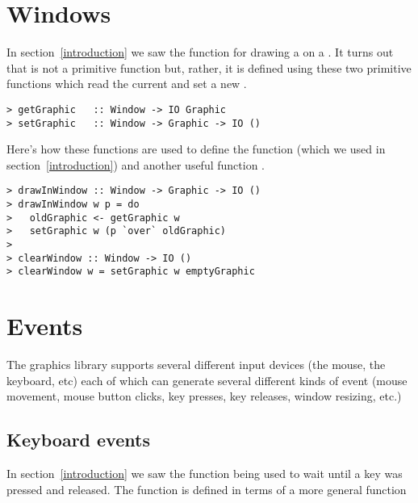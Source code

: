 
\section{Windows}\label{windows}

In section~\ref{introduction} we saw the function  for
drawing a  on a .  It turns out that
 is not a primitive function but, rather, it is defined
using these two primitive functions which read the current
 and set a new .

\begin{verbatim}
> getGraphic   :: Window -> IO Graphic
> setGraphic   :: Window -> Graphic -> IO ()
\end{verbatim}

Here's how these functions are used to define the function 
(which we used in section~\ref{introduction}) and another useful
function .

\begin{verbatim}
> drawInWindow :: Window -> Graphic -> IO ()
> drawInWindow w p = do
>   oldGraphic <- getGraphic w
>   setGraphic w (p `over` oldGraphic)
>
> clearWindow :: Window -> IO ()
> clearWindow w = setGraphic w emptyGraphic
\end{verbatim}



\section{Events}\label{events}

The graphics library supports several different input devices (the
mouse, the keyboard, etc) each of which can generate several different
kinds of event (mouse movement, mouse button clicks, key presses, key
releases, window resizing, etc.)


\subsection{Keyboard events}

In section~\ref{introduction} we saw the function  being
used to wait until a key was pressed and released.  The function
 is defined in terms of a more general function 

